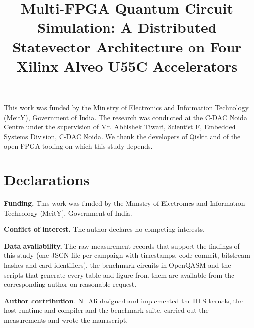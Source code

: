\documentclass[pdflatex,sn-mathphys-num]{sn-jnl}
\theoremstyle{thmstyleone}
\theoremstyle{thmstylethree}
\begin{document}
\title[Multi-FPGA Quantum Circuit Simulation]{Multi-FPGA Quantum Circuit Simulation: A Distributed Statevector Architecture on Four Xilinx Alveo U55C Accelerators}

\author*[1]{ }


\abstract{}


\maketitle












\backmatter

This work was funded by the Ministry of Electronics and Information Technology (MeitY), Government of India. The
research was conducted at the C-DAC Noida Centre under the supervision of Mr. Abhishek Tiwari, Scientist F, Embedded
Systems Division, C-DAC Noida. We thank the developers of Qiskit and of the open FPGA tooling on which this study
depends.

\section*{Declarations}

\textbf{Funding.} This work was funded by the Ministry of Electronics and Information Technology (MeitY), Government of India.

\textbf{Conflict of interest.} The author declares no competing interests.

\textbf{Data availability.} The raw measurement records that support the findings of this study (one JSON file per
campaign with timestamps, code commit, bitstream hashes and card identifiers), the benchmark circuits in OpenQASM and
the scripts that generate every table and figure from them are available from the corresponding author on reasonable
request.

\textbf{Author contribution.} N.~Ali designed and implemented the HLS kernels, the host runtime and compiler and the
benchmark suite, carried out the measurements and wrote the manuscript.


\end{document}

